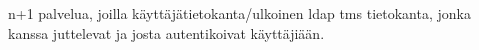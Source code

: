 n+1 palvelua, joilla käyttäjätietokanta/ulkoinen ldap tms tietokanta, jonka kanssa juttelevat ja josta autentikoivat käyttäjiään.